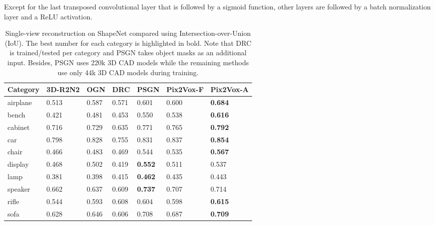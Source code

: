 \documentclass[10pt,twocolumn,letterpaper]{article}
\begin{document}
Except for the last transposed convolutional layer that is followed by a sigmoid function, other layers are followed by a batch normalization layer and a ReLU activation.

\begin{table*}[!t]
  \caption{Single-view reconstruction on ShapeNet compared using Intersection-over-Union (IoU). The best number for each category is highlighted in bold. Note that DRC \cite{DBLP:conf/cvpr/TulsianiZEM17} is trained/tested per category and PSGN \cite{DBLP:conf/cvpr/FanSG17} takes object masks as an additional input. Besides, PSGN uses 220k 3D CAD models while the remaining methods use only 44k 3D CAD models during training.}
  \vspace{-2 mm}
  \centering
  \begin{tabularx}{\linewidth}{XYYYYYY}
    \toprule
    Category     & 3D-R2N2 \cite{DBLP:conf/eccv/ChoyXGCS16}
                 & OGN \cite{DBLP:conf/iccv/TatarchenkoDB17}
                 & DRC \cite{DBLP:conf/cvpr/TulsianiZEM17}
                 & PSGN \cite{DBLP:conf/cvpr/FanSG17}
                 & Pix2Vox-F & Pix2Vox-A \\
    \midrule
    airplane     & 0.513      & 0.587      & 0.571
                 & 0.601      & 0.600      & \bf{0.684} \\
    bench        & 0.421      & 0.481      & 0.453
                 & 0.550      & 0.538      & \bf{0.616} \\
    cabinet      & 0.716      & 0.729      & 0.635
                 & 0.771      & 0.765      & \bf{0.792} \\
    car          & 0.798      & 0.828      & 0.755
                 & 0.831      & 0.837      & \bf{0.854} \\
    chair        & 0.466      & 0.483      & 0.469
                 & 0.544      & 0.535      & \bf{0.567} \\
    display      & 0.468      & 0.502      & 0.419
                 & \bf{0.552} & 0.511      & 0.537 \\
    lamp         & 0.381      & 0.398      & 0.415
                 & \bf{0.462} & 0.435      & 0.443 \\
    speaker      & 0.662      & 0.637      & 0.609
                 & \bf{0.737} & 0.707      & 0.714 \\
    rifle        & 0.544      & 0.593      & 0.608
                 & 0.604      & 0.598      & \bf{0.615} \\
    sofa         & 0.628      & 0.646      & 0.606
                 & 0.708      & 0.687      & \bf{0.709} \\

\end{tabularx}
\end{table*}
\end{document}
